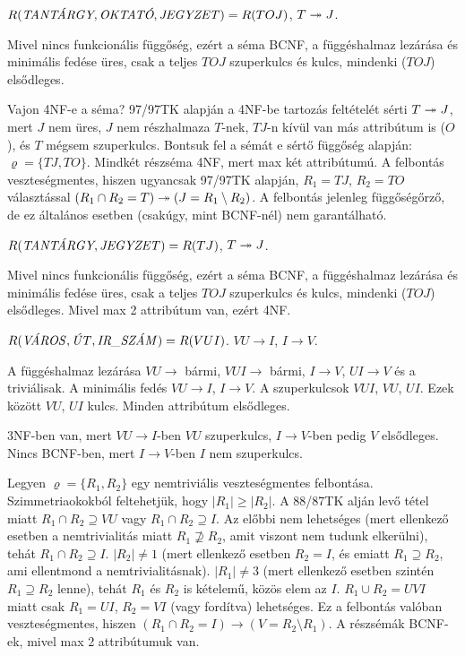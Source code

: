 \documentclass[a5paper]{article}
\begin{document}
$R(\hbox{\it TANTÁRGY},\hbox{\it OKTATÓ},\hbox{\it JEGYZET\/})=R(TOJ)$, $T\twoheadrightarrow J$.

\megoldas Mivel nincs funkcionális függőség, ezért a séma BCNF, a
függéshalmaz lezárása és minimális fedése üres, csak a teljes $TOJ$
szuperkulcs és kulcs, mindenki ($TOJ$) elsődleges.

Vajon 4NF-e a séma? 97/97TK alapján a 4NF-be tartozás feltételét sérti
$T\twoheadrightarrow J$, mert $J$ nem üres, $J$ nem részhalmaza $T$-nek, $TJ$-n kívül
van más attribútum is ($O$), és $T$ mégsem szuperkulcs. Bontsuk fel a sémát
e sértő függőség alapján: $\varrho=\{TJ,TO\}$. Mindkét részséma 4NF, mert
max két attribútumú. A felbontás veszteségmentes, hiszen ugyancsak 97/97TK
alapján, $R_1=TJ$, $R_2=TO$ választással $(R_1\cap R_2=T)\twoheadrightarrow
(J=R_1\setminus R_2)$. A felbontás jelenleg függőségőrző, de ez általános
esetben (csakúgy, mint BCNF-nél) nem garantálható.

$R(\hbox{\it TANTÁRGY},\hbox{\it JEGYZET\/})=R(TJ)$, $T\twoheadrightarrow J$.

\megoldas Mivel nincs funkcionális függőség, ezért a séma BCNF, a
függéshalmaz lezárása és minimális fedése üres, csak a teljes $TOJ$
szuperkulcs és kulcs, mindenki ($TOJ$) elsődleges. Mivel max 2 attribútum
van, ezért 4NF.

$R(\hbox{\it VÁROS\/},\hbox{\it ÚT\/},\hbox{\it IR\char 95 SZÁM\/})=
R(VUI)$. $VU\to I$, $I\to V$.

\megoldas A függéshalmaz lezárása $VU\to$ bármi, $VUI\to$
bármi, $I\to V$, $UI\to V$ és a triviálisak.
A minimális fedés $VU\to I$, $I\to V$.
A szuperkulcsok $VUI$, $VU$, $UI$. Ezek között $VU$, $UI$ kulcs.
Minden attribútum elsődleges.

3NF-ben van, mert $VU\to I$-ben $VU$ szuperkulcs, $I\to V$-ben pedig $V$
elsődleges. Nincs BCNF-ben, mert $I\to V$-ben $I$ nem szuperkulcs.

Legyen $\varrho=\{R_1, R_2\}$ egy nemtriviális veszteségmentes felbontása.
Szimmetriaokokból feltehetjük, hogy $|R_1|\ge|R_2|$. A 88/87TK alján levő tétel
miatt $R_1\cap R_2\supseteq VU$ vagy $R_1\cap R_2\supseteq I$. Az előbbi nem
lehetséges (mert ellenkező esetben a nemtrivialitás miatt
$R_1\not\supseteq R_2$, amit viszont nem tudunk elkerülni), tehát
$R_1\cap R_2\supseteq I$. $|R_2|\ne1$ (mert ellenkező esetben $R_2=I$, és
emiatt $R_1\supseteq R_2$, ami ellentmond a nemtrivialitásnak).
$|R_1|\ne 3$ (mert ellenkező esetben szintén $R_1\supseteq R_2$ lenne),
tehát $R_1$ és $R_2$ is kételemű, közös elem az $I$. $R_1\cup R_2=UVI$ miatt
csak $R_1=UI$, $R_2=VI$ (vagy fordítva) lehetséges. Ez a felbontás valóban
veszteségmentes, hiszen $(R_1\cap R_2=I)\to(V=R_2\setminus R_1)$. A
részsémák BCNF-ek, mivel max 2 attribútumuk van.
\end{document}
